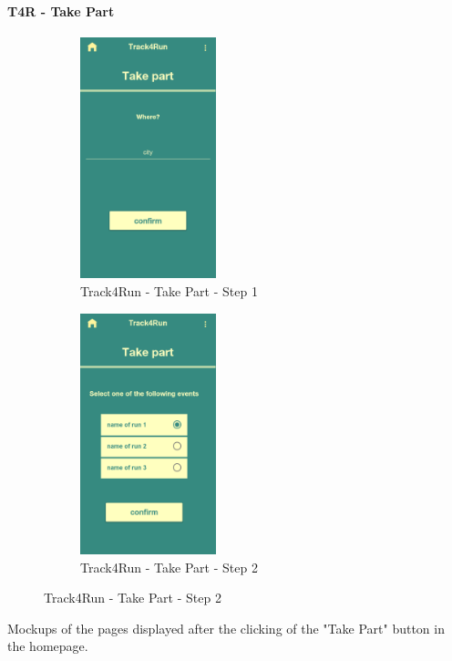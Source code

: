 \paragraph{T4R - Take Part}
\begin{figure}[H]
\centering
\begin{subfigure}{.5\textwidth}
    \includegraphics[width=.9\linewidth, height = 7cm, keepaspectratio]{./Images/Mockups/Track4Run/T4R_TakePart1.png}
    \centering
    \caption{Track4Run - Take Part - Step 1}
  \end{subfigure}%
\begin{subfigure}{.5\textwidth}
    \includegraphics[width=.9\linewidth, height = 7cm, keepaspectratio]{./Images/Mockups/Track4Run/T4R_TakePart2.png}
    \centering
    \caption{Track4Run - Take Part - Step 2}
  \end{subfigure}
\end{figure}
  Mockups of the pages displayed after the clicking of the "Take Part" button in the homepage.



